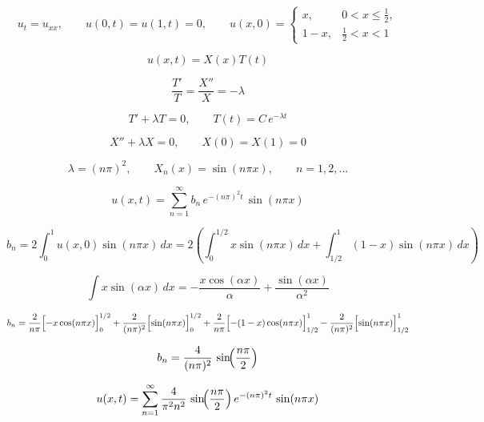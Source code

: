 \begin{solution}
\[
u_t=u_{xx},\qquad u(0,t)=u(1,t)=0,\qquad 
u(x,0)=
\begin{cases}
x,&0<x\le \frac12,\\[2pt]
1-x,&\frac12<x<1
\end{cases}
\]

\[
u(x,t)=X(x)T(t)
\]

\[
\frac{T'}{T}=\frac{X''}{X}=-\lambda
\]

\[
T'+\lambda T=0,\qquad T(t)=C\,e^{-\lambda t}
\]

\[
X''+\lambda X=0,\qquad X(0)=X(1)=0
\]

\[
\lambda=(n\pi)^2,\qquad X_n(x)=\sin(n\pi x),\qquad n=1,2,\ldots
\]

\[
u(x,t)=\sum_{n=1}^{\infty}b_n\,e^{-(n\pi)^2 t}\,\sin(n\pi x)
\]

\[
b_n=2\int_{0}^{1}u(x,0)\sin(n\pi x)\,dx
=2\!\left(\int_{0}^{1/2}x\sin(n\pi x)\,dx+\int_{1/2}^{1}(1-x)\sin(n\pi x)\,dx\right)
\]

\[
\int x\sin(\alpha x)\,dx=-\frac{x\cos(\alpha x)}{\alpha}+\frac{\sin(\alpha x)}{\alpha^2}
\]

\[
b_n=\frac{2}{n\pi}\Bigl[-x\cos(n\pi x)\Bigr]_{0}^{1/2}
+\frac{2}{(n\pi)^2}\Bigl[\sin(n\pi x)\Bigr]_{0}^{1/2}
+\frac{2}{n\pi}\Bigl[-(1-x)\cos(n\pi x)\Bigr]_{1/2}^{1}
-\frac{2}{(n\pi)^2}\Bigl[\sin(n\pi x)\Bigr]_{1/2}^{1}
\]

\[
b_n=\frac{4}{(n\pi)^2}\,\sin\!\Bigl(\frac{n\pi}{2}\Bigr)
\]

\[
u(x,t)=\sum_{n=1}^{\infty}\frac{4}{\pi^2 n^2}\,\sin\!\Bigl(\frac{n\pi}{2}\Bigr)\,e^{-(n\pi)^2 t}\,\sin(n\pi x)
\]   
\end{solution}
